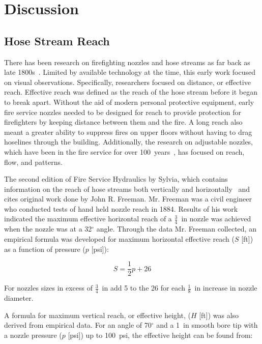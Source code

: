 \documentclass[12pt,oneside]{book}
\begin{document}
\chapter{Discussion}

\section{Hose Stream Reach}
\label{sec:hose_reach}
There has been research on firefighting nozzles and hose streams as far back as late 1800s~\cite{CHICAGO_TRIBUNE:1339:a}. Limited by available technology at the time, this early work focused on visual observations. Specifically, researchers focused on distance, or effective reach. Effective reach was defined as the reach of the hose stream before it began to break apart. Without the aid of modern personal protective equipment, early fire service nozzles needed to be designed for reach to provide protection for firefighters by keeping distance between them and the fire. A long reach also meant a greater ability to suppress fires on upper floors without having to drag hoselines through the building. Additionally, the research on adjustable nozzles, which have been in the fire service for over 100~years~\cite{PALMER:1878}, has focused on reach, flow, and patterns. 

The second edition of Fire Service Hydraulics by Sylvia, which contains information on the reach of hose streams both vertically and horizontally~\cite{SYLVIA:1970} and cites original work done by John R. Freeman. Mr. Freeman was a civil engineer who conducted tests of hand held nozzle reach in 1884. Results of his work indicated the maximum effective horizontal reach of a $\frac{3}{4}$~in nozzle was achieved when the nozzle was at a 32$^\circ$ angle. Through the data Mr. Freeman collected, an empirical formula was developed for maximum horizontal effective reach ($S$ [ft]) as a function of pressure ($p$ [psi]): 

\begin{equation*}
	S = \frac{1}{2}p+26
\end{equation*}

For nozzles sizes in excess of $\frac{3}{4}$~in add 5 to the 26 for each $\frac{1}{8}$~in increase in nozzle diameter. 

A formula for maximum vertical reach, or effective height, ($H$ [ft]) was also derived from empirical data. For an angle of 70$^{\circ}$ and a 1~in smooth bore tip with a nozzle pressure ($p$ [psi]) up to 100~psi, the effective height can be found from:
\end{document}
